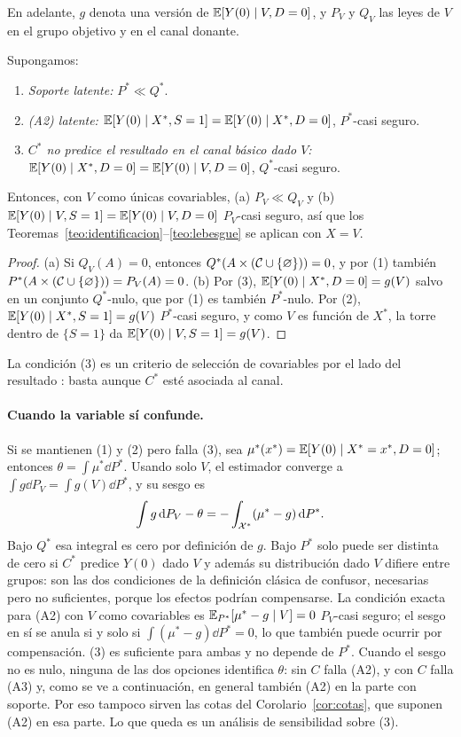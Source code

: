 En adelante, $g$ denota una versión de $\mathbb{E}[Y(0)\mid V,D=0]$, y $P_V$ y $Q_V$ las leyes de $V$ en el grupo objetivo y en el canal donante.

\begin{proposicion}\label{prop:descartar}
Supongamos:
\begin{enumerate}
  \item \emph{Soporte latente:} $P^*\ll Q^*$.
  \item \emph{(A2) latente:} $\mathbb{E}[Y(0)\mid X^*,S=1]=\mathbb{E}[Y(0)\mid X^*,D=0]$, $P^*$-casi seguro.
  \item \emph{$C^*$ no predice el resultado en el canal básico dado $V$:} $\mathbb{E}[Y(0)\mid X^*,D=0]=\mathbb{E}[Y(0)\mid V,D=0]$, $Q^*$-casi seguro.
\end{enumerate}
Entonces, con $V$ como únicas covariables, (a) $P_V\ll Q_V$ y (b) $\mathbb{E}[Y(0)\mid V,S=1]=\mathbb{E}[Y(0)\mid V,D=0]$ $P_V$-casi seguro, así que los Teoremas~\ref{teo:identificacion}--\ref{teo:lebesgue} se aplican con $X=V$.
\end{proposicion}
\begin{proof}
(a) Si $Q_V(A)=0$, entonces $Q^*(A\times(\mathcal C\cup\{\varnothing\}))=0$, y por (1) también $P^*(A\times(\mathcal C\cup\{\varnothing\}))=P_V(A)=0$.
(b) Por (3), $\mathbb{E}[Y(0)\mid X^*,D=0]=g(V)$ salvo en un conjunto $Q^*$-nulo, que por (1) es también $P^*$-nulo. Por (2), $\mathbb{E}[Y(0)\mid X^*,S=1]=g(V)$ $P^*$-casi seguro, y como $V$ es función de $X^*$, la torre dentro de $\{S=1\}$ da $\mathbb{E}[Y(0)\mid V,S=1]=g(V)$.
\end{proof}

La condición (3) es un criterio de selección de covariables por el lado del resultado \citep{deluna2011,vanderweele2011}: basta aunque $C^*$ esté asociada al canal.

\paragraph{Cuando la variable sí confunde.} Si se mantienen (1) y (2) pero falla (3), sea $\mu^*(x^*)=\mathbb{E}[Y(0)\mid X^*=x^*,D=0]$; entonces $\theta=\int\mu^*\dd P^*$. Usando solo $V$, el estimador converge a $\int g\dd P_V=\int g(V)\dd P^*$, y su sesgo es
\[
\int g\,\mathrm{d} P_V-\theta=-\int_{\mathcal{X}^*}(\mu^*-g)\,\mathrm{d} P^*.
\]
Bajo $Q^*$ esa integral es cero por definición de $g$. Bajo $P^*$ solo puede ser distinta de cero si $C^*$ predice $Y(0)$ dado $V$ y además su distribución dado $V$ difiere entre grupos: son las dos condiciones de la definición clásica de confusor, necesarias pero no suficientes, porque los efectos podrían compensarse. La condición exacta para (A2) con $V$ como covariables es $\mathbb{E}_{P^*}[\mu^*-g\mid V]=0$ $P_V$-casi seguro; el sesgo en sí se anula si y solo si $\int(\mu^*-g)\dd P^*=0$, lo que también puede ocurrir por compensación. (3) es suficiente para ambas y no depende de $P^*$. Cuando el sesgo no es nulo, ninguna de las dos opciones identifica $\theta$: sin $C$ falla (A2), y con $C$ falla (A3) y, como se ve a continuación, en general también (A2) en la parte con soporte. Por eso tampoco sirven las cotas del Corolario~\ref{cor:cotas}, que suponen (A2) en esa parte. Lo que queda es un análisis de sensibilidad sobre (3).

